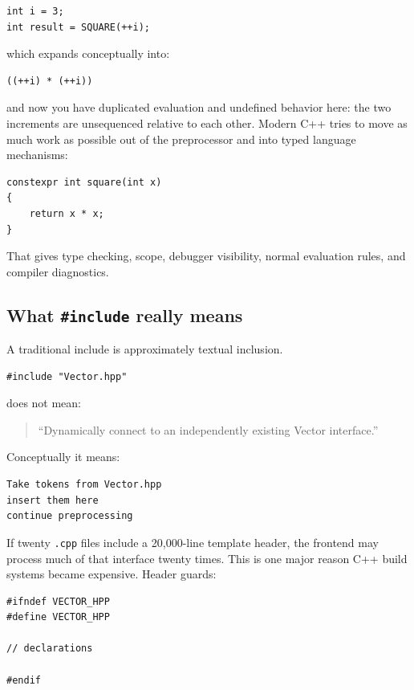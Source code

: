 \begin{verbatim}
int i = 3;
int result = SQUARE(++i);
\end{verbatim}

which expands conceptually into:

\begin{verbatim}
((++i) * (++i))
\end{verbatim}

and now you have duplicated evaluation and undefined behavior here: the two increments are unsequenced relative to each other. Modern C++ tries to move as much work as possible out of the preprocessor and into typed language mechanisms:

\begin{verbatim}
constexpr int square(int x)
{
    return x * x;
}
\end{verbatim}

That gives type checking, scope, debugger visibility, normal evaluation rules, and compiler diagnostics.

\subsection{\texorpdfstring{What \texttt{\#include} really means}{What \#include really means}}\label{01-foundations-i-ch002-what-include-really-means}

A traditional include is approximately textual inclusion.

\begin{verbatim}
#include "Vector.hpp"
\end{verbatim}

does not mean:

\begin{quote}
``Dynamically connect to an independently existing Vector interface.''
\end{quote}

Conceptually it means:

\begin{verbatim}
Take tokens from Vector.hpp
insert them here
continue preprocessing
\end{verbatim}

If twenty \texttt{.cpp} files include a 20,000-line template header, the frontend may process much of that interface twenty times. This is one major reason C++ build systems became expensive. Header guards:

\begin{verbatim}
#ifndef VECTOR_HPP
#define VECTOR_HPP

// declarations

#endif
\end{verbatim}

